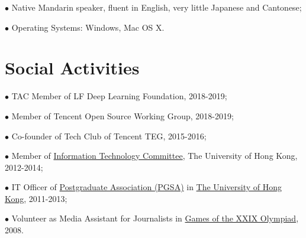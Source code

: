 \documentclass[10pt]{article}
\renewcommand{\section}[2]%
        {\pagebreak[2]\vspace{1.3\baselineskip}%
         \phantomsection\addcontentsline{toc}{section}{#1}%
         \hspace{0in}%
         \marginpar{
         \raggedright \scshape #1}#2}
\begin{document}
$\bullet$ Native Mandarin speaker, fluent in English, very little Japanese and Cantonese;

$\bullet$ Operating Systems: Windows, Mac OS X.


\section{Social Activities}
$\bullet$ TAC Member of LF Deep Learning Foundation, 2018-2019;

$\bullet$ Member of Tencent Open Source Working Group, 2018-2019;

$\bullet$ Co-founder of Tech Club of Tencent TEG, 2015-2016;

$\bullet$ Member of \href{http://intraweb.hku.hk/local/its/itc.html}{Information Technology Committee}, The University of Hong Kong, 2012-2014;

$\bullet$ IT Officer of \href{http://www.pgsa.hku.hk/}{Postgraduate Association (PGSA)} in
 \href{http://www.hku.hk/}{The University of Hong Kong}, 2011-2013;

$\bullet$ Volunteer as Media Assistant for Journalists in \href{http://en.wikipedia.org/wiki/2008_Summer_Olympics}{Games of the XXIX Olympiad}, 2008.
\end{document}
